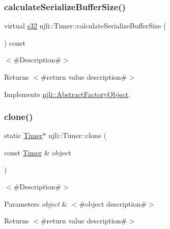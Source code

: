 \mbox{\label{classnjli_1_1_timer_a329822765b1177b2cead8b24ef7b34e8}} 
\subsubsection{\texorpdfstring{calculate\+Serialize\+Buffer\+Size()}{calculateSerializeBufferSize()}}
{\footnotesize\ttfamily virtual \mbox{\hyperlink{_util_8h_aa62c75d314a0d1f37f79c4b73b2292e2}{s32}} njli\+::\+Timer\+::calculate\+Serialize\+Buffer\+Size (\begin{DoxyParamCaption}{ }\end{DoxyParamCaption}) const\hspace{0.3cm}{\ttfamily [virtual]}}

$<$\#\+Description\#$>$

\begin{DoxyReturn}{Returns}
$<$\#return value description\#$>$ 
\end{DoxyReturn}


Implements \mbox{\hyperlink{classnjli_1_1_abstract_factory_object_a4763d05bc9dc37c559111f8bb30e1dd8}{njli\+::\+Abstract\+Factory\+Object}}.

\mbox{\label{classnjli_1_1_timer_a8e41dc40fb85189351121e8de88dd77d}} 
\subsubsection{\texorpdfstring{clone()}{clone()}}
{\footnotesize\ttfamily static \mbox{\hyperlink{classnjli_1_1_timer}{Timer}}$\ast$ njli\+::\+Timer\+::clone (\begin{DoxyParamCaption}\item[{const \mbox{\hyperlink{classnjli_1_1_timer}{Timer}} \&}]{object }\end{DoxyParamCaption})\hspace{0.3cm}{\ttfamily [static]}}

$<$\#\+Description\#$>$


\begin{DoxyParams}{Parameters}
{\em object} & $<$\#object description\#$>$\\
\hline
\end{DoxyParams}
\begin{DoxyReturn}{Returns}
$<$\#return value description\#$>$ 
\end{DoxyReturn}
\mbox{\label{classnjli_1_1_timer_a3929a946ac20c6d0e68602bba1d66583}} 
